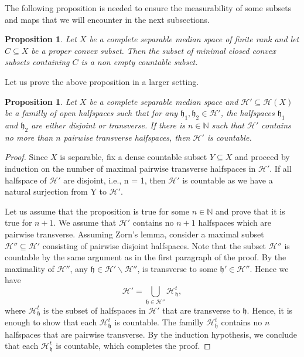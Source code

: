 \documentclass{amsart}
\numberwithin{equation}{section}
\newtheorem{prop}[thm]{Proposition}
\newcommand{\HH}{\mathcal{H}}     %
\newcommand{\hh}{\mathfrak{h}}    %
\newcommand{\NN}{\mathbb{N}}      %
\theoremstyle{definition}
\begin{document}
The following proposition is needed to ensure the measurability of some subsets and maps that we will encounter in the next subsections.
\begin{prop}\label{prop_minimal_halfspace_countable_orig}
    Let $X$ be a complete separable median space of finite rank and let $C\subseteq X$ be a proper convex subset. Then the subset of minimal closed convex subsets containing $C$ is a non empty countable subset.
\end{prop}
Let us prove the above proposition in a larger setting.
\begin{prop}\label{prop_minimal_halfspace_countable}
    Let $X$ be a complete separable median space and $\HH'\subseteq \HH(X)$ be a familly of open halfspaces such that for any $\hh_1,\hh_2\in\HH'$, the halfspaces $\hh_1$ and $\hh_2$ are either disjoint or transverse. If there is $n\in \NN$ such that $\HH'$ contains no more than $n$ pairwise transverse halfspaces, then $\HH'$ is countable.
\end{prop}
\begin{proof}Since $X$ is separable, fix a dense countable subset $Y\subseteq X$ and proceed by induction on the number of maximal pairwise transverse halfspaces in $\HH'$. If all halfspace of $\HH'$ are disjoint, i.e., n = 1, then $\HH'$ is countable as we have a natural surjection from Y to $\HH'$.\par 
Let us assume that the proposition is true for some $n\in\NN$ and prove that it is true for $n+1$. We assume that $\HH'$ contains no $n+1$ halfspaces which are pairwise transverse. Assuming Zorn's lemma, consider a maximal subset $\HH''\subseteq \HH'$ consisting of pairwise disjoint halfspaces. Note that the subset $\HH''$ is countable by the same argument as in the first paragraph of the proof. By the maximality of $\HH''$, any $\hh\in \HH'\backslash\HH''$, is transverse to some $\hh'\in\HH''$. Hence we have 
\[
\HH'=\bigcup_{\hh\in \HH''}\HH_\hh^t,
\]
where $\HH_\hh^t$ is the subset of halfspaces in $\HH'$ that are transverse to $\hh$. Hence, it is enough to show that each $\HH_\hh^t$ is countable. The familly $\HH_\hh^t$ contains no $n$ halfspaces that are pairwise transverse. By the induction hypothesis, we conclude that each $\HH_\hh^t$ is countable, which completes the proof.


\end{proof}
\end{document}
